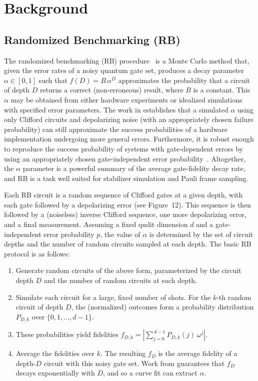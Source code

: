\section{Background}

\subsection{Randomized Benchmarking (RB)}
The randomized benchmarking (RB) procedure~\cite{RBRef} is a Monte Carlo method that, given the error rates of a noisy quantum gate set, produces a decay parameter $\alpha \in [0,1]$ such that $f(D) = B\,\alpha^D$ approximates the probability that a circuit of depth $D$ returns a correct (non-erroneous) result, where $B$ is a constant. This $\alpha$ may be obtained from either hardware experiments or idealized simulations with specified error parameters. The work in \cite{Ref14,Ref50,Ref51} establishes that a simulated $\alpha$ using only Clifford circuits and depolarizing noise (with an appropriately chosen failure probability) can still approximate the success probabilities of a hardware implementation undergoing more general errors. Furthermore, it is robust enough to reproduce the success probability of systems with gate-dependent errors by using an appropriately chosen gate-independent error probability~\cite{Ref66}. Altogether, the $\alpha$ parameter is a powerful summary of the average gate-fidelity decay rate, and RB is a task well suited for stabilizer simulation and Pauli frame sampling.

Each RB circuit is a random sequence of Clifford gates at a given depth, with each gate followed by a depolarizing error (see Figure~12). This sequence is then followed by a (noiseless) inverse Clifford sequence, one more depolarizing error, and a final measurement. Assuming a fixed qudit dimension $d$ and a gate-independent error probability $p$, the value of $\alpha$ is determined by the set of circuit depths and the number of random circuits sampled at each depth. The basic RB protocol is as follows:
\begin{enumerate}
    \item Generate random circuits of the above form, parameterized by the circuit depth $D$ and the number of random circuits at each depth.
    \item Simulate each circuit for a large, fixed number of shots. For the $k$-th random circuit of depth $D$, the (normalized) outcomes form a probability distribution $P_{D,k}$ over $\{0,1,\ldots,d-1\}$.
    \item These probabilities yield fidelities $f_{D,k} = \left|\sum_{j=0}^{\,d-1} P_{D,k}(j)\,\omega^j \right|$.
    \item Average the fidelities over $k$. The resulting $f_D$ is the average fidelity of a depth-$D$ circuit with this noisy gate set. Work from \cite{Ref66} guarantees that $f_D$ decays exponentially with $D$, and so a curve fit can extract $\alpha$.
\end{enumerate}

